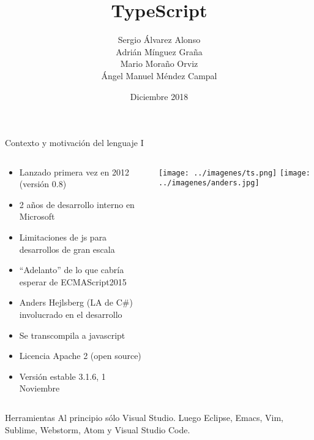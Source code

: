 \documentclass{beamer}
\title %
{TypeScript}
\author[Author, Anders] %
{Sergio Álvarez Alonso \\ Adrián Mínguez Graña \\  Mario Moraño Orviz \\ 
Ángel Manuel Méndez Campal}
\institute[Universities Here and There] %
{
	\inst{}%
	Máster ingeniería web\\
	Universidad de Oviedo

}
\date[KPT 2004] %
{Diciembre 2018}
\begin{document}
	
	\frame{\titlepage}
	
\small
\begin{frame}{Contexto y motivación del lenguaje I}
\begin{columns}[T] %
	\begin{column}[T]{8cm} %

		\begin{itemize}
			\item Lanzado primera vez en 2012 (versión 0.8)
			\item 2 años de desarrollo interno en Microsoft
			\item Limitaciones de js para desarrollos de gran escala
			\item ``Adelanto'' de lo que cabría esperar de ECMAScript2015
			\item Anders Hejlsberg (LA de C\#) involucrado en el desarrollo
			\item Se transcompila a javascript
			\item Licencia Apache 2 (open source)
			\item Versión estable 3.1.6, 1 Noviembre
		\end{itemize}
	
	\end{column}
	\begin{column}[T]{3cm} %
		\texttt{[image: ../imagenes/ts.png]}
		\texttt{[image: ../imagenes/anders.jpg]}
	\end{column}

\end{columns}

\begin{block}{Herramientas}
	Al principio sólo Visual Studio. Luego Eclipse, Emacs, Vim, Sublime, Webstorm,
	Atom y Visual Studio Code.
\end{block}

\end{frame}
\end{document}
